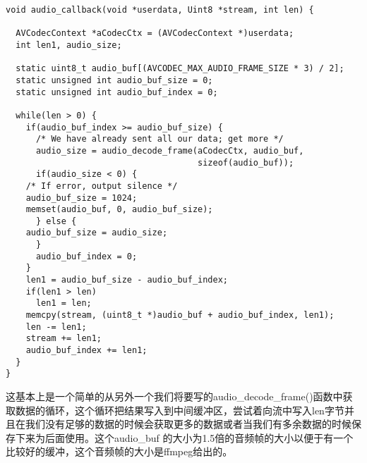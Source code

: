 \begin{lstlisting}
void audio_callback(void *userdata, Uint8 *stream, int len) {

  AVCodecContext *aCodecCtx = (AVCodecContext *)userdata;
  int len1, audio_size;

  static uint8_t audio_buf[(AVCODEC_MAX_AUDIO_FRAME_SIZE * 3) / 2];
  static unsigned int audio_buf_size = 0;
  static unsigned int audio_buf_index = 0;

  while(len > 0) {
    if(audio_buf_index >= audio_buf_size) {
      /* We have already sent all our data; get more */
      audio_size = audio_decode_frame(aCodecCtx, audio_buf,
                                      sizeof(audio_buf));
      if(audio_size < 0) {
    /* If error, output silence */
    audio_buf_size = 1024;
    memset(audio_buf, 0, audio_buf_size);
      } else {
    audio_buf_size = audio_size;
      }
      audio_buf_index = 0;
    }
    len1 = audio_buf_size - audio_buf_index;
    if(len1 > len)
      len1 = len;
    memcpy(stream, (uint8_t *)audio_buf + audio_buf_index, len1);
    len -= len1;
    stream += len1;
    audio_buf_index += len1;
  }
}
\end{lstlisting}

这基本上是一个简单的从另外一个我们将要写的audio_decode_frame()函数中获取数据的循环，这个循环把结果写入到中间缓冲区，尝试着向流中写入len字节并且在我们没有足够的数据的时候会获取更多的数据或者当我们有多余数据的时候保存下来为后面使用。这个audio_buf 的大小为1.5倍的音频帧的大小以便于有一个比较好的缓冲，这个音频帧的大小是ffmpeg给出的。

